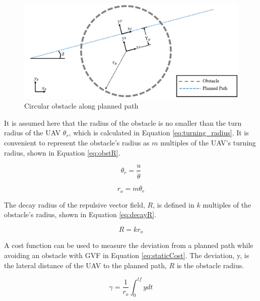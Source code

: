 \documentclass[numbered,pdftex]{ohio-etd}
\begin{document}
\begin{figure}[H]
	\centering
	\includegraphics[width=14cm]{Figures/methods/obstacleOnPath}
	\caption{Circular obstacle along planned path}
	\label{fig:obstacleonpath}
\end{figure}

 It is assumed here that the radius of the obstacle is no smaller than the turn radius of the UAV $\theta_r$, which is calculated in Equation \ref{eq:turning_radius}. It is convenient to represent the obstacle's radius as $m$ multiples of the UAV's turning radius, shown in  Equation \ref{eq:obstR}.
 


\begin{equation}
\label{eq:turning_radius}
\theta_r = \frac{u}{\dot{\theta}}
\end{equation}

\begin{equation}
\label{eq:obstR}
r_o = m \theta_r
\end{equation}

The decay radius of the repulsive vector field, $R$, is defined in $k$ multiples of the obstacle's radius, shown in Equation \ref{eq:decayR}. 
 
 \begin{equation}
 \label{eq:decayR}
 R = k r_o
 \end{equation}
 
 

 A cost function can be used to measure the deviation from a planned path while avoiding an obstacle with GVF in Equation \ref{eq:staticCost}. The deviation, y, is the lateral distance of the UAV to the planned path, $R$ is the obstacle radius.
 
 \begin{equation}
 \label{eq:staticCost}
 \gamma = \frac{1}{r_o}\int_{0}^{tf}ydt
 \end{equation}
 
\end{document}
